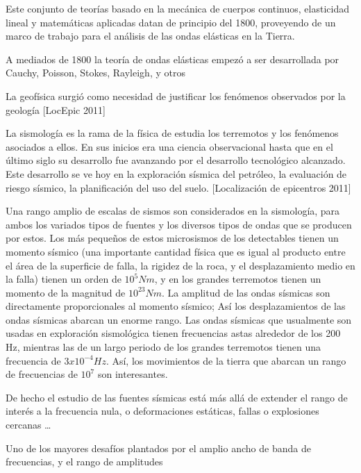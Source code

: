 Este conjunto de teorías basado en la mecánica de cuerpos continuos, elasticidad
lineal y matemáticas aplicadas datan de principio del 1800, proveyendo de un
marco de trabajo para el análisis de las ondas elásticas en la Tierra.

A mediados de 1800 la teoría de ondas elásticas empezó a ser desarrollada por
Cauchy, Poisson, Stokes, Rayleigh, y otros \cite[pp. 2]{Shearer2009}


La geofísica surgió como necesidad de justificar los fenómenos observados por la
geología [LocEpic 2011]

La sismología es la rama de la física de estudia los terremotos y los fenómenos
asociados a ellos. En sus inicios era una ciencia observacional hasta que en el
último siglo su desarrollo fue avanzando por el desarrollo tecnológico
alcanzado. Este desarrollo se ve hoy en la exploración sísmica del petróleo, la
evaluación de riesgo sísmico, la planificación del uso del suelo. [Localización
de epicentros 2011]

Una rango amplio de escalas de sismos son considerados en la sismología, para
ambos los variados tipos de fuentes y los diversos tipos de ondas que se
producen por estos. Los más pequeños de estos microsismos de los detectables
tienen un momento sísmico (una importante cantidad física que es igual al
producto entre el área de la superficie de falla, la rigidez de la roca, y el
desplazamiento medio en la falla) tienen un orden de $10^5 Nm$, y en los grandes
terremotos tienen un momento de la magnitud de $10^23 Nm$. La amplitud de las
ondas sísmicas son directamente proporcionales al momento sísmico; Así los
desplazamientos de las ondas sísmicas abarcan un enorme rango. Las ondas
sísmicas que usualmente son usadas en exploración sismológica tienen frecuencias
astas alrededor de los 200 Hz, mientras las de un largo periodo de los grandes
terremotos tienen una frecuencia de $3x10^{-4} Hz$. Así, los movimientos de la
tierra que abarcan un rango de frecuencias de $10^7$ son interesantes.

De hecho el estudio de las fuentes sísmicas está más allá de extender el rango
de interés a la frecuencia nula, o deformaciones estáticas, fallas o explosiones
cercanas …

Uno de los mayores desafíos plantados por el amplio ancho de banda de
frecuencias, y el rango de amplitudes

